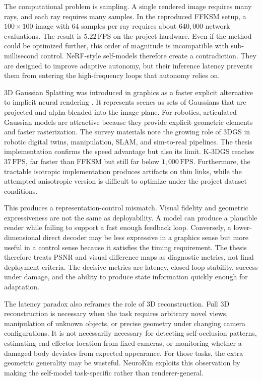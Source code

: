 \documentclass[12pt,a4paper,oneside]{report}
\begin{document}
The computational problem is sampling. A single rendered image requires many rays, and each ray requires many samples. In the reproduced FFKSM setup, a $100 \times 100$ image with $64$ samples per ray requires about $640{,}000$ network evaluations. The result is $5.22\,\mathrm{FPS}$ on the project hardware. Even if the method could be optimized further, this order of magnitude is incompatible with sub-millisecond control. NeRF-style self-models therefore create a contradiction. They are designed to improve adaptive autonomy, but their inference latency prevents them from entering the high-frequency loops that autonomy relies on.

3D Gaussian Splatting was introduced in graphics as a faster explicit alternative to implicit neural rendering \cite{kerbl20233d}. It represents scenes as sets of Gaussians that are projected and alpha-blended into the image plane. For robotics, articulated Gaussian models are attractive because they provide explicit geometric elements and faster rasterization. The survey materials note the growing role of 3DGS in robotic digital twins, manipulation, SLAM, and sim-to-real pipelines. The thesis implementation confirms the speed advantage but also its limit. K-3DGS reaches $37\,\mathrm{FPS}$, far faster than FFKSM but still far below $1{,}000\,\mathrm{FPS}$. Furthermore, the tractable isotropic implementation produces artifacts on thin links, while the attempted anisotropic version is difficult to optimize under the project dataset conditions.

This produces a representation-control mismatch. Visual fidelity and geometric expressiveness are not the same as deployability. A model can produce a plausible render while failing to support a fast enough feedback loop. Conversely, a lower-dimensional direct decoder may be less expressive in a graphics sense but more useful in a control sense because it satisfies the timing requirement. The thesis therefore treats PSNR and visual difference maps as diagnostic metrics, not final deployment criteria. The decisive metrics are latency, closed-loop stability, success under damage, and the ability to produce state information quickly enough for adaptation.

The latency paradox also reframes the role of 3D reconstruction. Full 3D reconstruction is necessary when the task requires arbitrary novel views, manipulation of unknown objects, or precise geometry under changing camera configurations. It is not necessarily necessary for detecting self-occlusion patterns, estimating end-effector location from fixed cameras, or monitoring whether a damaged body deviates from expected appearance. For those tasks, the extra geometric generality may be wasteful. NeuroKin exploits this observation by making the self-model task-specific rather than renderer-general.
\end{document}
